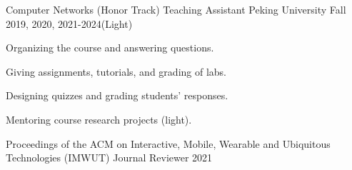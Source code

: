 \documentclass[11pt, a4paper]{awesome-cv}
\begin{document}
\begin{cventries}
	
	\cventry
	{Computer Networks (Honor Track)}
	{Teaching Assistant}
	{Peking University}
	{Fall 2019, 2020, 2021-2024(Light)}
	{
		\begin{cvitems} %
			\item {Organizing the course and answering questions.}
			\item {Giving assignments, tutorials, and grading of labs.}
			\item {Designing quizzes and grading students' responses.}
			\item {Mentoring course research projects (light).}
		\end{cvitems}
	}
	
	\cventry
	{Proceedings of the ACM on Interactive, Mobile, Wearable and Ubiquitous Technologies (IMWUT)} %
	{Journal Reviewer} %
	{} %
	{2021} %
	{}	
	
\end{cventries}

%
%
%
%
%
%
%
%


\end{document}
